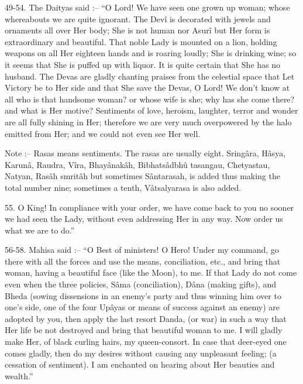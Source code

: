 49-54. The Daityas said :-- ``O Lord! We have seen one grown up woman; whose whereabouts we are quite ignorant. The Dev\^i is decorated with jewels and ornaments all over Her body; She is not human nor Asur\^i but Her form is extraordinary and beautiful. That noble Lady is mounted on a lion, holding weapons on all Her eighteen hands and is roaring loudly; She is drinking wine; so it seems that She is puffed up with liquor. It is quite certain that She has no husband. The Devas are gladly chanting praises from the celestial space that Let Victory be to Her side and that She save the Devas, O Lord! We don't know at all who is that handsome woman? or whose wife is she; why has she come there? and what is Her motive? Sentiments of love, heroism, laughter, terror and wonder are all fully shining in Her; therefore we are very much overpowered by the halo emitted from Her; and we could not even see Her well.

Note :-- Rasas means sentiments. The rasas are usually eight. Sring\^ara, H\^asya, Karun\^a, Raudra, V\^ira, Bhay\^anak\^ah, Bibhats\^adbh\^u tasangau, Chetyastau, Natyan, Ras\^ah smrit\^ah but sometimes S\^antarasah, is added thus making the total number nine; sometimes a tenth, V\^atsalyarasa is also added.

55. O King! In compliance with your order, we have come back to you no sooner we had seen the Lady, without even addressing Her in any way. Now order us what we are to do.''

56-58. Mahisa said :-- ``O Best of ministers! O Hero! Under my command, go there with all the forces and use the means, conciliation, etc., and bring that woman, having a beautiful face (like the Moon), to me. If that Lady do not come even when the three policies, S\^ama (conciliation), D\^ana (making gifts), and Bheda (sowing dissensions in an enemy's party and thus winning him over to one's side, one of the four Up\^ayas or means of success against an enemy) are adopted by you, then apply the last resort Danda, (or war) in such a way that Her life be not destroyed and bring that beautiful woman to me. I will gladly make Her, of black curling hairs, my queen-consort. In case that deer-eyed one comes gladly, then do my desires without causing any unpleasant feeling; (a cessation of sentiment). I am enchanted on hearing about Her beauties and wealth.''


